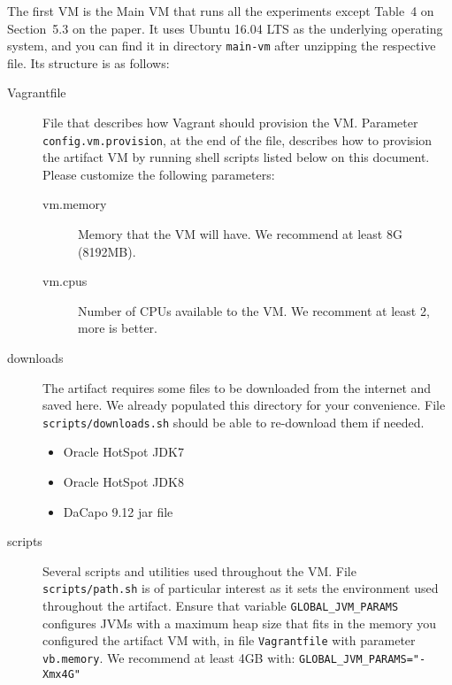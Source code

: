 \documentclass[12pt]{article}
\newcommand{\host}[1]{\colorbox{blue!20}{\texttt{\color{black}#1}}}
\begin{document}
The first VM is the Main VM that runs all the experiments except Table~4 on
Section~5.3 on the paper.  It uses Ubuntu 16.04 LTS as the underlying operating
system, and you can find it in directory \host{main-vm} after unzipping the
respective file.  Its structure is as follows:

\begin{description}

    \item[Vagrantfile] File that describes how Vagrant should provision the VM.
        Parameter \texttt{config.vm.provision}, at the end of the file,
        describes how to provision the artifact VM by running shell scripts
        listed below on this document.  Please customize the following
        parameters:

        \begin{description}

            \item[vm.memory] Memory that the VM will have.  We recommend at least 8G (8192MB).

            \item[vm.cpus] Number of CPUs available to the VM.  We recomment at least 2, more is better.

        \end{description}

    \item[downloads] The artifact requires some files to be downloaded from the
        internet and saved here.  We already populated this directory for your
        convenience.  File \host{scripts/downloads.sh} should be able to
        re-download them if needed.

        \begin{itemize}

            \item Oracle HotSpot JDK7

            \item Oracle HotSpot JDK8

            \item DaCapo 9.12 jar file

        \end{itemize}

    \item[scripts]  Several scripts and utilities used throughout the VM.  File
        \host{scripts/path.sh} is of particular interest as it sets the
        environment used throughout the artifact.  Ensure that variable
        \texttt{GLOBAL\_JVM\_PARAMS} configures JVMs with a maximum heap size
        that fits in the memory you configured the artifact VM with, in file
        \host{Vagrantfile} with parameter \texttt{vb.memory}.  We recommend at
        least 4GB with: \texttt{GLOBAL\_JVM\_PARAMS="-Xmx4G"}


\end{description}
\end{document}
